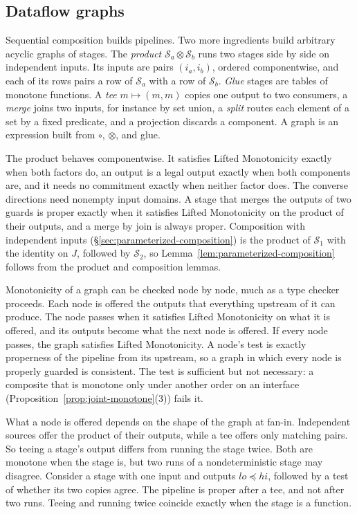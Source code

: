 \documentclass[sigconf]{cidr-2027}
\theoremstyle{remark}
\newcommand{\commitment}{commitment\xspace}
\newcommand{\Spec}{\mathcal{S}}
\begin{document}
\subsection{Dataflow graphs}
\label{app:dataflow-graphs}

Sequential composition builds pipelines.  Two more ingredients build
arbitrary acyclic graphs of stages.  The \emph{product}
$\Spec_a\otimes\Spec_b$ runs two stages side by side on independent inputs.
Its inputs are pairs $(i_a,i_b)$, ordered componentwise, and each of its rows
pairs a row of $\Spec_a$ with a row of $\Spec_b$.  \emph{Glue} stages are
tables of monotone functions.  A \emph{tee} $m\mapsto(m,m)$ copies one output
to two consumers, a \emph{merge} joins two inputs, for instance by set union,
a \emph{split} routes each element of a set by a fixed predicate, and a
projection discards a component.  A graph is an expression built from
$\circ$, $\otimes$, and glue.

The product behaves componentwise.  It satisfies Lifted Monotonicity exactly
when both factors do, an output is a legal output exactly when both components
are, and it needs no \commitment exactly when neither factor does.  The
converse directions need nonempty input domains.  A stage that merges the
outputs of two guards is proper exactly when it satisfies Lifted Monotonicity
on the product of their outputs, and a merge by join is always proper.
Composition with independent inputs (\S\ref{sec:parameterized-composition})
is the product of $\Spec_1$ with the identity on $J$, followed by $\Spec_2$, so
Lemma~\ref{lem:parameterized-composition} follows from the product and
composition lemmas.

Monotonicity of a graph can be checked node by node, much as a type checker
proceeds.  Each node is offered the outputs that everything upstream of it
can produce.  The node passes when it satisfies Lifted Monotonicity on what it
is offered, and its outputs become what the next node is offered.  If every
node passes, the graph satisfies Lifted Monotonicity.  A node's test is
exactly properness of the pipeline from its upstream, so a graph in which
every node is properly guarded is consistent.  The test is sufficient but not
necessary: a composite that is monotone only under another order on an
interface (Proposition~\ref{prop:joint-monotone}(3)) fails it.

What a node is offered depends on the shape of the graph at fan-in.
Independent sources offer the product of their outputs, while a tee offers
only matching pairs.  So teeing a stage's output differs from running the
stage twice.  Both are monotone when the stage is, but two runs of a
nondeterministic stage may disagree.  Consider a stage with one input and
outputs $\mathit{lo}\preceq\mathit{hi}$, followed by a test of whether its two
copies agree.  The pipeline is proper after a tee, and not after two runs.
Teeing and running twice coincide exactly when the stage is a function.
\end{document}
